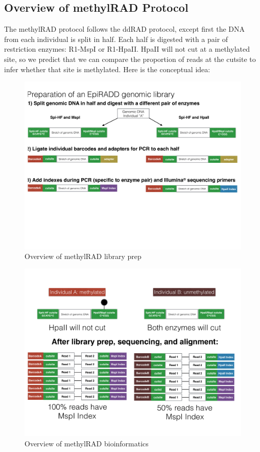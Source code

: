 \documentclass[11pt, oneside]{article}
\begin{document}
	\subsection {Overview of methylRAD Protocol}
		The methylRAD protocol follows the ddRAD protocol, except first the DNA from each individual is split in half.  Each half is digested with a pair of restriction enzymes: R1-MspI or R1-HpaII.  HpaII will not cut at a methylated site, so we predict that we can compare the proportion of reads at the cutsite to infer whether that site is methylated.  Here is the conceptual idea:
		\begin{figure}[h]
			\includegraphics[width=5in]{./images/methylRAdd_prep.pdf}
			\caption{Overview of methylRAD library prep}
		\end{figure}
		\begin{figure}[h]
			\includegraphics[width=5in]{./images/methylRAdd_bioinf.pdf}
			\caption{Overview of methylRAD bioinformatics}
		\end{figure}
\end{document}
